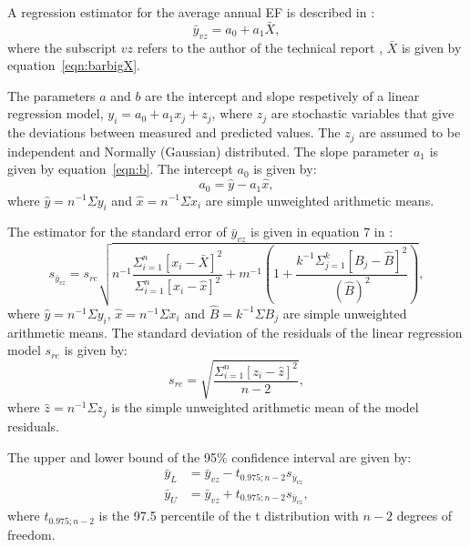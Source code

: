 A regression estimator for the average annual EF is described in \citet{vanZanten}:
\begin{equation}\label{eqn:vanzanten}
\bar{y}_{vz} = a_0 + a_1\bar{X},
\end{equation}
where the subscript $vz$ refers to the author of the technical report \citet{vanZanten}, $\bar{X}$ is given by equation~\ref{eqn:barbigX}. 

The parameters $a$ and $b$ are the intercept and slope respetively of a linear regression model, $y_i = a_0 + a_1 x_j + z_j$, where $z_j$ are stochastic variables that give the deviations between measured and predicted values. The $z_j$ are assumed to be independent and Normally (Gaussian) distributed. The slope parameter $a_1$ is given by equation~\ref{eqn:b}. The intercept $a_0$ is given by:
\begin{equation}\label{eqn:a}
a_0 = \hat{y}-a_1\hat{x},
\end{equation}
where $\hat{y}=n^{-1}\Sigma y_i$ and $\hat{x}=n^{-1}\Sigma x_i$ are simple unweighted arithmetic means.

The estimator for the standard error of $\bar{y}_{vz}$ is given in equation 7 in \citet{vanZanten}:
\begin{equation}\label{eqn:varvz}
s_{\bar{y}_{vz}}=s_{re} \sqrt{n^{-1} \frac{\Sigma_{i=1}^n [x_i-\bar{X}]^2}{\Sigma_{i=1}^n [x_i - \hat{x}]^2} + m^{-1} \left( 1 + \frac{k^{-1}\Sigma_{j=1}^k[B_j-\hat{B}]^2}{ (\hat{B})^2 } \right) },
\end{equation}
where $\hat{y}=n^{-1}\Sigma y_i$, $\hat{x}=n^{-1}\Sigma x_i$ and $\hat{B}=k^{-1}\Sigma B_j$ are simple unweighted arithmetic means. The standard deviation of the residuals of the linear regression model $s_{re}$ is given by:
\begin{equation}\label{eqn:sresiduals}
s_{re}=\sqrt{\frac{\Sigma_{i=1}^n[z_i-\hat{z}]^2}{n-2}},
\end{equation}
where $\hat{z}=n^{-1}\Sigma z_j$ is the simple unweighted arithmetic mean of the model residuals.

The upper and lower bound of the 95\% confidence interval are given by:
\begin{subequations}\label{eqn:civz}
	\begin{align}
	\bar{y}_{L} &= \bar{y}_{vz}-t_{0.975;n-2}s_{\bar{y}_{vz}} \\
	\bar{y}_{U} &= \bar{y}_{vz}+t_{0.975;n-2}s_{\bar{y}_{vz}} ,
	\end{align}
\end{subequations}
where $t_{0.975;n-2}$ is the 97.5 percentile of the t distribution with $n-2$ degrees of freedom.

